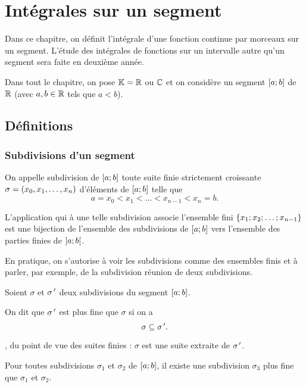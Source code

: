 \chapter{Intégrales sur un segment}

\minitoc

Dans ce chapitre, on définit l'intégrale d'une fonction continue par morceaux sur un segment. L'étude des intégrales de fonctions sur un intervalle autre qu'un segment sera faite en deuxième année.

Dans tout le chapitre, on pose \(\mathbb{K}=\mathbb{R}\) ou \(\mathbb{C}\) et on considère un segment \(\left[a;b\right]\) de \(\mathbb{R}\) (avec \(a,b\in\mathbb{R}\) tels que \(a<b\)).

\section{Définitions}

\subsection{Subdivisions d'un segment}

\begin{defi}
On appelle subdivision de \(\left[a;b\right]\) toute suite finie strictement croissante \(\sigma=\left(x_0,x_1,\dots,x_n\right)\) d'éléments de \(\left[a;b\right]\) telle que \[a=x_0<x_1<\dots<x_{n-1}<x_n=b.\]

L'application qui à une telle subdivision associe l'ensemble fini \(\left\lbrace x_1;x_2;\dots;x_{n-1}\right\rbrace\) est une bijection de l'ensemble des subdivisions de \(\left[a;b\right]\) vers l'ensemble des parties finies de \(\left]a;b\right[\).

En pratique, on s'autorise à voir les subdivisions comme des ensembles finis et à parler, par exemple, de la subdivision réunion de deux subdivisions.
\end{defi}

\begin{defi}
Soient \(\sigma\) et \(\sigma^{\,\prime}\) deux subdivisions du segment \(\left[a;b\right]\).

On dit que \(\sigma^{\,\prime}\) est plus fine que \(\sigma\) si on a \[\sigma\subseteq\sigma^{\,\prime}.\]

\Cad, du point de vue des suites finies : \(\sigma\) est une suite extraite de \(\sigma^{\,\prime}\).
\end{defi}

\begin{rem}
Pour toutes subdivisions \(\sigma_1\) et \(\sigma_2\) de \(\left[a;b\right]\), il existe une subdivision \(\sigma_3\) plus fine que \(\sigma_1\) et \(\sigma_2\).
\end{rem}

